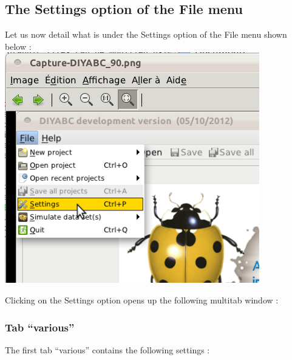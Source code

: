 \subsection{The \textsf{Settings} option of the \textsf{File} menu}

Let us now detail what is under the \textsf{Settings} option of the \textsf{File} menu shown below :\\

\includegraphics[scale=0.33]{gui_pictures/Capture-DIYABC-91.png} \\

\newpage

Clicking on the \textsf{Settings} option opens up the following multitab window :\\

\subsubsection{Tab \textsf{``various''}}
The first tab \textsf{``various''} contains the following settings :

